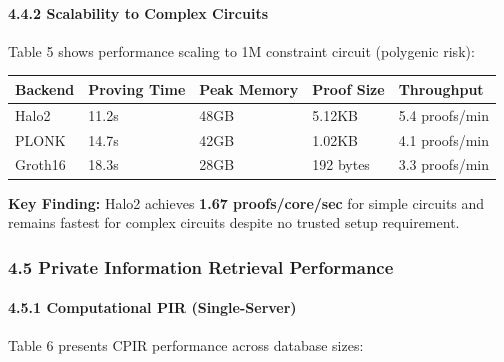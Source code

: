 \documentclass[
  11pt,
]{article}
\begin{document}
\paragraph{4.4.2 Scalability to Complex
Circuits}\label{scalability-to-complex-circuits}

Table 5 shows performance scaling to 1M constraint circuit (polygenic
risk):

\begin{longtable}[]{@{}lllll@{}}
\toprule\noalign{}
Backend & Proving Time & Peak Memory & Proof Size & Throughput \\
\midrule\noalign{}
\endhead
\bottomrule\noalign{}
\endlastfoot
Halo2 & 11.2s & 48GB & 5.12KB & 5.4 proofs/min \\
PLONK & 14.7s & 42GB & 1.02KB & 4.1 proofs/min \\
Groth16 & 18.3s & 28GB & 192 bytes & 3.3 proofs/min \\
\end{longtable}

\textbf{Key Finding:} Halo2 achieves \textbf{1.67 proofs/core/sec} for
simple circuits and remains fastest for complex circuits despite no
trusted setup requirement.

\subsubsection{4.5 Private Information Retrieval
Performance}\label{private-information-retrieval-performance}

\paragraph{4.5.1 Computational PIR
(Single-Server)}\label{computational-pir-single-server-1}

Table 6 presents CPIR performance across database sizes:
\end{document}
